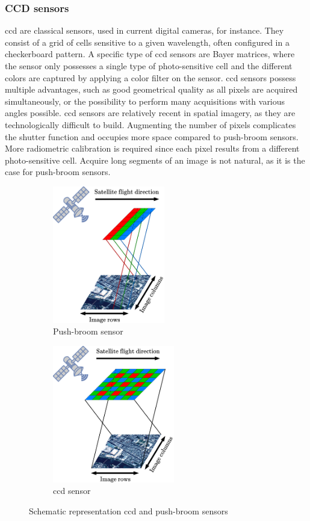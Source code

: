 \subsubsection{CCD sensors}
\acrfull{ccd} are classical sensors, used in current digital cameras, for instance. They consist of a grid of cells sensitive to a given wavelength, often configured in a checkerboard pattern. A specific type of \acrshort{ccd} sensors are Bayer matrices, where the sensor only possesses a single type of photo-sensitive cell and the different colors are captured by applying a color filter on the sensor. \acrshort{ccd} sensors possess multiple advantages, such as good geometrical quality as all pixels are acquired simultaneously, or the possibility to perform many acquisitions with various angles possible. \acrshort{ccd} sensors are relatively recent in spatial imagery, as they are technologically difficult to build. Augmenting the number of pixels complicates the shutter function and occupies more space compared to push-broom sensors. More radiometric calibration is required since each pixel results from a different photo-sensitive cell. Acquire long segments of an image is not natural, as it is the case for push-broom sensors.

\begin{figure}
    \begin{subfigure}[t]{0.5\linewidth}
        \centering
        \includegraphics[height=6cm]{Images/Chap_1/pushbrrom.png}
        \caption{Push-broom sensor}
        \label{fig:pushbroom}
    \end{subfigure}
    \begin{subfigure}[t]{0.5\linewidth}
        \centering
        \includegraphics[height=6cm]{Images/Chap_1/CCD.png}
        \caption{\acrshort{ccd} sensor}
        \label{fig:ccd}
    \end{subfigure}
    \caption{Schematic representation \acrshort{ccd} and push-broom sensors}
    \label{fig:ccd_pushbroom_sensors}
\end{figure}

